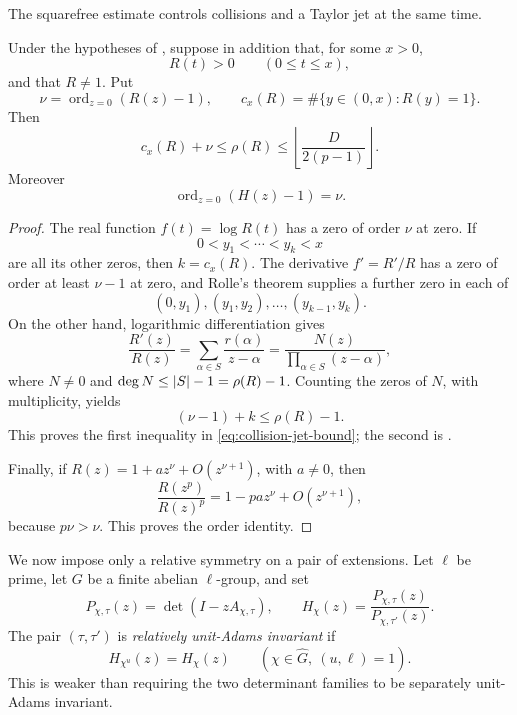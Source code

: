 The squarefree estimate controls collisions and a Taylor jet at the same
time.

\begin{theorem}
\label{thm:collision-jet-inequality}
Under the hypotheses of , suppose in
addition that, for some \(x>0\),
\[
 R(t)>0\qquad(0\le t\le x),
\]
and that \(R\ne1\).  Put
\[
 \nu=\operatorname{ord}_{z=0}(R(z)-1),
 \qquad
 c_x(R)=\#\{y\in(0,x):R(y)=1\}.
\]
Then
\begin{equation}\label{eq:collision-jet-bound}
 c_x(R)+\nu\le\rho(R)
 \le\left\lfloor\frac{D}{2(p-1)}\right\rfloor.
\end{equation}
Moreover
\[
 \operatorname{ord}_{z=0}(H(z)-1)=\nu.
\]
\end{theorem}

\begin{proof}
The real function \(f(t)=\log R(t)\) has a zero of order \(\nu\) at zero.
If
\[
 0<y_1<\cdots<y_k<x
\]
are all its other zeros, then \(k=c_x(R)\).  The derivative
\(f'=R'/R\) has a zero of order at least \(\nu-1\) at zero, and Rolle's
theorem supplies a further zero in each of
\[
 (0,y_1),(y_1,y_2),\ldots,(y_{k-1},y_k).
\]
On the other hand, logarithmic differentiation gives
\[
 \frac{R'(z)}{R(z)}
 =\sum_{\alpha\in S}\frac{r(\alpha)}{z-\alpha}
 =\frac{N(z)}{\prod_{\alpha\in S}(z-\alpha)},
\]
where \(N\ne0\) and \(\deg N\le\lvert S \rvert-1=\rho(R)-1\).  Counting the
zeros of \(N\), with multiplicity, yields
\[
 (\nu-1)+k\le\rho(R)-1.
\]
This proves the first inequality in \eqref{eq:collision-jet-bound}; the
second is .

Finally, if \(R(z)=1+az^\nu+O(z^{\nu+1})\), with \(a\ne0\), then
\[
 \frac{R(z^p)}{R(z)^p}=1-pa z^\nu+O(z^{\nu+1}),
\]
because \(p\nu>\nu\).  This proves the order identity.
\end{proof}

We now impose only a relative symmetry on a pair of extensions.  Let
\(\ell\) be prime, let \(G\) be a finite abelian \(\ell\)-group, and set
\[
 P_{\chi,\tau}(z)=\det(I-zA_{\chi,\tau}),
 \qquad
 H_\chi(z)=\frac{P_{\chi,\tau}(z)}{P_{\chi,\tau'}(z)}.
\]
The pair \((\tau,\tau')\) is \emph{relatively unit-Adams invariant} if
\begin{equation}\label{eq:relative-unit-adams}
 H_{\chi^u}(z)=H_\chi(z)
 \qquad
 (\chi\in\widehat G,\ (u,\ell)=1).
\end{equation}
This is weaker than requiring the two determinant families to be separately
unit-Adams invariant.

